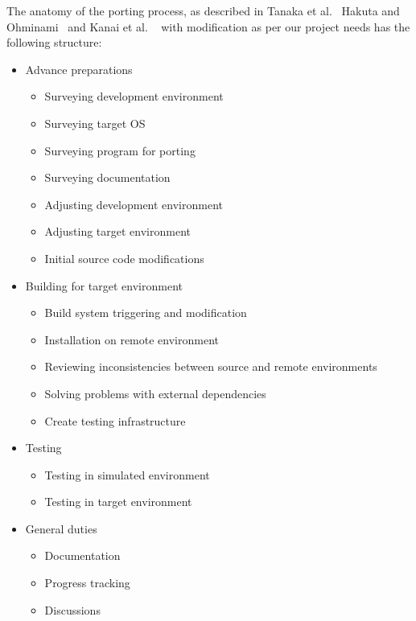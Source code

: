 The anatomy of the porting process, as described in Tanaka et al.~\cite{b1}
Hakuta and Ohminami~\cite{b2} and Kanai et al. ~\cite{b4} with modification as
per our project needs has the following structure:
\begin{itemize}
    \item Advance preparations
        \begin{itemize}
            \item Surveying development environment
            \item Surveying target OS
            \item Surveying program for porting
            \item Surveying documentation
            \item Adjusting development environment
            \item Adjusting target environment
            \item Initial source code modifications
        \end{itemize}
    \item Building for target environment
        \begin{itemize}
            \item Build system triggering and modification
            \item Installation on remote environment
            \item Reviewing inconsistencies between source and remote environments
            \item Solving problems with external dependencies
            \item Create testing infrastructure
        \end{itemize}
    \item Testing
        \begin{itemize}
            \item Testing in simulated environment
            \item Testing in target environment
        \end{itemize}
    \item General duties
        \begin{itemize}
            \item Documentation
            \item Progress tracking
            \item Discussions
        \end{itemize}
\end{itemize}


